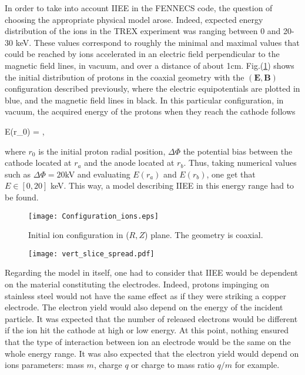 In order to take into account IIEE in the FENNECS code, the question of choosing the appropriate physical model arose. Indeed, expected energy distribution of the ions in the TREX experiment was ranging between 0 and 20-30 keV. These values correspond to roughly the minimal and maximal values that could be reached by ions accelerated in an electric field perpendicular to the magnetic field lines, in vacuum, and over a distance of about 1cm. Fig.(\ref{Config_ions}) shows the initial distribution of protons in the coaxial geometry with the $(\mathbf{E}, \mathbf{B})$ configuration described previously, where the electric equipotentials are plotted in blue, and the magnetic field lines in black. In this particular configuration, in vacuum, the acquired energy of the protons when they reach the cathode follows 

\beq
E(r_0) = \Delta \Phi {},      
\eeq
 
\noindent where $r_0$ is the initial proton radial position, $\Delta \Phi$ the potential bias between the cathode located at $r_a$ and the anode located at $r_b$. Thus, taking numerical values such as $\Delta \Phi = 20$kV and evaluating $E(r_a)$ and $E(r_b)$, one get that $E\in [0,20]$ keV. This way, a model describing IIEE in this energy range had to be found.\\


\begin{figure}[h!]
\centering
	\texttt{[image: Configuration\_ions.eps]}
	\caption{\label{Config_ions} Initial ion configuration in ($R,Z$) plane. The geometry is coaxial.}
\end{figure}  

\begin{figure}[h!]
\centering
	\texttt{[image: vert\_slice\_spread.pdf]}
	\caption{\label{vert_spread} }
\end{figure}  



\noindent Regarding the model in itself, one had to consider that IIEE would be dependent on the material constituting the electrodes. Indeed, protons impinging on stainless steel would not have the same effect as if they were striking a copper electrode. The electron yield would also depend on the energy of the incident particle. It was expected that the number of released electrons would be different if the ion hit the cathode at high or low energy. At this point, nothing ensured that the type of interaction between ion an electrode would be the same on the whole energy range. It was also expected that the electron yield would depend on ions parameters: mass $m$, charge $q$ or charge to mass ratio $q/m$ for example.\\

